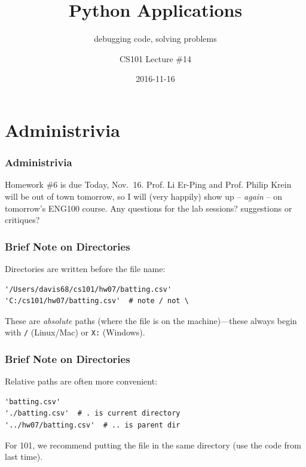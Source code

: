\documentclass[11pt]{beamer}
\title{Python Applications}
\subtitle{debugging code, solving problems}
\author{CS101 Lecture \#14}
\date{2016-11-16}
\begin{document}
  \setcounter{showProgressBar}{0}
  \setcounter{showSlideNumbers}{0}

\frame{\titlepage}

\setcounter{framenumber}{0}
\setcounter{showProgressBar}{1}
\setcounter{showSlideNumbers}{1}

\section{Administrivia}

\begin{frame}
  \frametitle{Administrivia}
  \Enlarge

  \begin{itemize}
  \myitem  Homework \#6 is due Today, Nov.\ 16.
  \myitem Prof. Li Er-Ping and Prof. Philip Krein will be out of town tomorrow, so I will (very happily) show up -- \emph{again} -- on tomorrow's ENG100 course.
  \myitem  Any questions for the lab sessions? suggestions or critiques?
  \end{itemize}
\end{frame}

\iffalse

\begin{frame}[fragile]
  \frametitle{Brief Note on Directories}
  \Enlarge

  \begin{itemize}
  \myitem  Directories are written before the file name:
    \begin{Verbatim}
'/Users/davis68/cs101/hw07/batting.csv'
'C:/cs101/hw07/batting.csv'  # note / not \
    \end{Verbatim}
  \myitem  These are \emph{absolute} paths (where the file is on the machine)---these always begin with \texttt{/} (Linux/Mac) or \texttt{X:} (Windows).
  \end{itemize}
\end{frame}

\begin{frame}[fragile]
  \frametitle{Brief Note on Directories}
  \Enlarge

  \begin{itemize}
  \myitem  Relative paths are often more convenient:
    \begin{Verbatim}
'batting.csv'
'./batting.csv'  # . is current directory
'../hw07/batting.csv'  # .. is parent dir
    \end{Verbatim}
  \myitem  For 101, we recommend putting the file in the same directory (use the code from last time).
  \end{itemize}
\end{frame}
\end{document}

